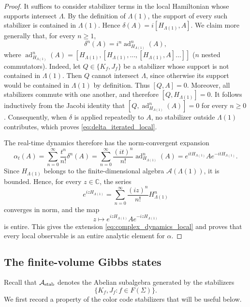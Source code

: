 \documentclass[a4paper,11pt]{article}
\theoremstyle{definition}
\theoremstyle{remark}
\theoremstyle{remark}
\begin{document}
\begin{proof}
It suffices to consider stabilizer terms in the local Hamiltonian whose supports intersect $\Lambda$. By the definition of $\Lambda(1)$, the support of every such stabilizer is contained in $\Lambda(1)$. Hence $\delta(A)=i[H_{\Lambda(1)},A]$. We claim more generally that, for every $n\geq1$,
\begin{equation}\label{eq:delta_iterated_local}
\delta^n(A)=i^n\operatorname{ad}_{H_{\Lambda(1)}}^n(A),
\end{equation}
where $\operatorname{ad}_{H_{\Lambda(1)}}^n(A)=[H_{\Lambda(1)},[H_{\Lambda(1)},\ldots,[H_{\Lambda(1)},A]\ldots]]$ ($n$ nested commutators). Indeed, let $Q\in\{K_f,J_f\}$ be a stabilizer whose support is not contained in $\Lambda(1)$. Then $Q$ cannot intersect $\Lambda$, since otherwise its support would be contained in $\Lambda(1)$ by definition. Thus $[Q,A]=0$. Moreover, all stabilizers commute with one another, and therefore $[Q,H_{\Lambda(1)}]=0$. It follows inductively from the Jacobi identity that $[Q,\operatorname{ad}_{H_{\Lambda(1)}}^n(A)]=0$ for every $n\geq0$. Consequently, when $\delta$ is applied repeatedly to $A$, no stabilizer outside $\Lambda(1)$ contributes, which proves \eqref{eq:delta_iterated_local}.

The real-time dynamics therefore has the norm-convergent expansion
\[
\alpha_t(A)
=
\sum_{n=0}^{\infty}\frac{t^n}{n!}\delta^n(A)
=
\sum_{n=0}^{\infty}\frac{(it)^n}{n!}\operatorname{ad}_{H_{\Lambda(1)}}^n(A)
=
e^{itH_{\Lambda(1)}}Ae^{-itH_{\Lambda(1)}}.
\]
Since $H_{\Lambda(1)}$ belongs to the finite-dimensional algebra $\mathcal A(\Lambda(1))$, it is bounded. Hence, for every $z\in\mathbb C$, the series
\[
e^{izH_{\Lambda(1)}}=\sum_{n=0}^{\infty}\frac{(iz)^n}{n!}H_{\Lambda(1)}^n
\]
converges in norm, and the map
\[
z\mapsto e^{izH_{\Lambda(1)}}Ae^{-izH_{\Lambda(1)}}
\]
is entire. This gives the extension \eqref{eq:complex_dynamics_local} and proves that every local observable is an entire analytic element for $\alpha$.
\end{proof}



\subsection{The finite-volume Gibbs states}

Recall that $\mathcal A_{\rm stab}$ denotes the Abelian subalgebra generated by the stabilizers
\[
    \{K_f,J_f:f\in F(\Sigma)\}.
\]
We first record a property of the color code stabilizers that will be useful below.
\end{document}
